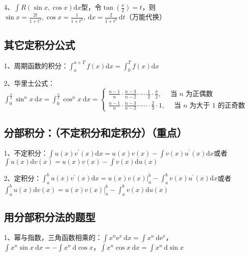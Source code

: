 4、$\int R(\sin x, \cos x) \mathrm{d} x$型，令$\tan({\frac{x}{2}})=t$，则$\sin x=\frac{2 t}{1+t^{2}}, \cos x=\frac{1}{1+t^{2}}, \mathrm{~d} x=\frac{2}{1+t^{2}} \mathrm{~d} t$（万能代换）



\subsection{其它定积分公式}

1、周期函数的积分：$\int_{a}^{a+T} f(x) \mathrm{d} x=\int_{0}^{T} f(x) \mathrm{d} x$

2、华里士公式：$\int_{0}^{\frac{\pi}{2}} \sin ^{n} x \mathrm{~d} x=\int_{0}^{\frac{\pi}{2}} \cos ^{n} x \mathrm{~d} x=\left\{\begin{array}{l}\frac{n-1}{n} \cdot \frac{n-3}{n-2} \cdots \cdots \frac{1}{2} \cdot \frac{\pi}{2}, \quad \text { 当 } n \text { 为正偶数 } \\\frac{n-1}{n} \cdot \frac{n-3}{n-2} \cdots \cdots \cdot \frac{2}{3} \cdot 1, \quad \text { 当 } n \text { 为大于 } 1 \text { 的正奇数 }\end{array}\right.$



\subsection{分部积分：（不定积分和定积分）（重点）}

1、不定积分：$\int u(x) v^{\prime}(x) \mathrm{d} x=u(x) v(x)-\int v(x) u^{\prime}(x) \mathrm{d} x$或者$\int u(x) \mathrm{d} v(x)=u(x) v(x)-\int v(x) \mathrm{d} u(x)$

2、定积分：$\int_{a}^{b} u(x) v^{\prime}(x) \mathrm{d} x=\left.u(x) v(x)\right|_{a} ^{b}-\int_{a}^{b} v(x) u^{\prime}(x) \mathrm{d} x$或者$\int_{a}^{b} u(x) \mathrm{d} v(x)=\left.u(x) v(x)\right|_{a} ^{b}-\int_{a}^{b} v(x) \mathrm{d} u(x)$



\subsection{用分部积分法的题型}

1、幂与指数，三角函数相乘的：$\int x^{n} \mathrm{e}^{x} \mathrm{~d} x=\int x^{n} \mathrm{~d} \mathrm{e}^{x}$，$\int x^{n} \sin x \mathrm{~d} x=-\int x^{n} \mathrm{~d} \cos x$，$\int x^{n} \cos x \mathrm{~d} x=\int x^{n} \mathrm{~d} \sin x$

